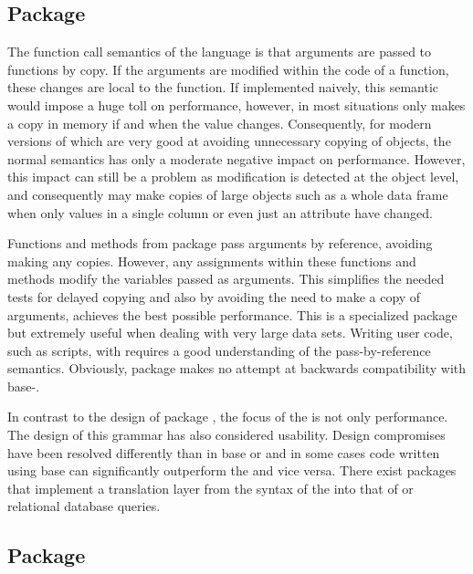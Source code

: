 \documentclass[krantz2]{krantz}\usepackage{knitr}
\begin{document}
\subsection{Package }
The function call semantics of the \Rlang language is that arguments are passed to functions by copy. If the arguments are modified within the code of a function, these changes are local to the function. If implemented naively, this semantic would impose a huge toll on performance, however, \Rlang in most situations only makes a copy in memory if and when the value changes. Consequently, for modern versions of \Rlang which are very good at avoiding unnecessary copying of objects, the normal \Rlang semantics has only a moderate negative impact on performance. However, this impact can still be a problem as modification is detected at the object level, and consequently \Rlang may make copies of large objects such as a whole data frame when only values in a single column or even just an attribute have changed.

Functions and methods from package  pass arguments by reference, avoiding making any copies. However, any assignments within these functions and methods modify the variables passed as arguments. This simplifies the needed tests for delayed copying and also by avoiding the need to make a copy of arguments, achieves the best possible performance. This is a specialized package but extremely useful when dealing with very large data sets. Writing user code, such as scripts, with  requires a good understanding of the pass-by-reference semantics. Obviously, package  makes no attempt at backwards compatibility with base-\Rlang {}.

In contrast to the design of package , the focus of the  is not only performance. The design of this grammar has also considered usability. Design compromises have been resolved differently than in base \Rlang or  and in some cases code written using base \Rlang can significantly outperform the  and vice versa. There exist packages that implement a translation layer from the syntax of the  into that of  or relational database queries.

\subsection{Package }\label{sec:data:tibble}
\end{document}
